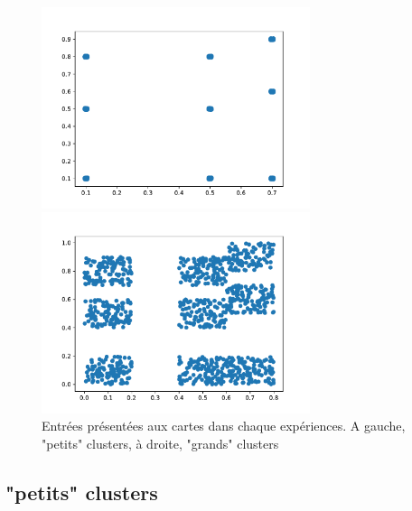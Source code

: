 \begin{figure}[h!]
\begin{minipage}{0.5\textwidth}
\centering\includegraphics[width=0.7\textwidth]{2som_cluster_in}
\end{minipage}
\begin{minipage}{0.5\textwidth}
\centering\includegraphics[width=0.7\textwidth]{2som_cluster001_in}
\end{minipage}
\caption{Entrées présentées aux cartes dans chaque expériences. A gauche, "petits" clusters, à droite, "grands" clusters}
\label{fig:cluster_in}
\end{figure}



\subsection{"petits" clusters}

